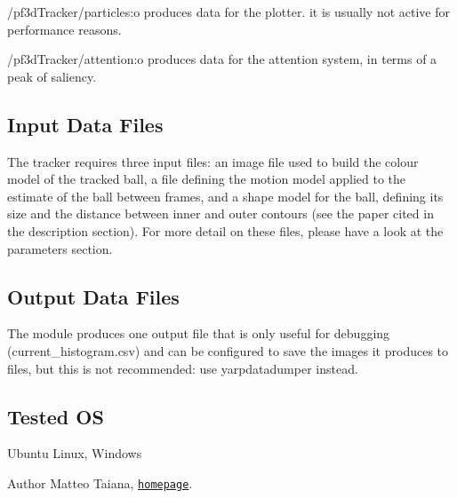 \begin{DoxyItemize}
\item /pf3d\+Tracker/particles\+:o produces data for the plotter. it is usually not active for performance reasons.
\item /pf3d\+Tracker/attention\+:o produces data for the attention system, in terms of a peak of saliency.
\end{DoxyItemize}\hypertarget{group__icub__pf3dTracker_in_files_sec}{}\subsection{Input Data Files}\label{group__icub__pf3dTracker_in_files_sec}
The tracker requires three input files\+: an image file used to build the colour model of the tracked ball, a file defining the motion model applied to the estimate of the ball between frames, and a shape model for the ball, defining its size and the distance between inner and outer contours (see the paper cited in the description section). For more detail on these files, please have a look at the parameters section.\hypertarget{group__icub__pf3dTracker_out_data_sec}{}\subsection{Output Data Files}\label{group__icub__pf3dTracker_out_data_sec}
The module produces one output file that is only useful for debugging (current\+\_\+histogram.\+csv) and can be configured to save the images it produces to files, but this is not recommended\+: use yarpdatadumper instead.\hypertarget{group__src__demoYoga_tested_os_sec}{}\subsection{Tested OS}\label{group__src__demoYoga_tested_os_sec}
Ubuntu Linux, Windows

\begin{DoxyAuthor}{Author}
Matteo Taiana, \href{http://users.isr.ist.utl.pt/~mtaiana/}{\tt homepage}. 
\end{DoxyAuthor}
